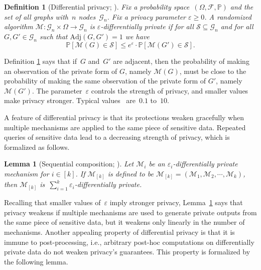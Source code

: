 \documentclass[conference]{ieeeconf}
\newtheorem{definition}{Definition}
\newtheorem{lemma}{Lemma}
\newcommand{\G}{\mathcal{G}}
\newcommand{\M}{\mathcal{M}}
\newcommand{\Adj}{\mathrm{Adj}}
\begin{document}
\begin{definition}[{Differential privacy; \cite{dwork2014algorithmic}}]\label{def:dp}
    Fix a probability space~$(\Omega, \mathcal{F}, \mathbb{P})$ and the set of all graphs with~$n$ nodes~$\G_n$. Fix a privacy parameter $\varepsilon \geq 0$. A randomized algorithm $\M:\G_n\times \Omega\to \G_n$ is $\varepsilon$-differentially private if for all $\mathcal{S} \subseteq \G_n$ and for all $G, G' \in \G_n$ such that $\Adj(G,G')=1$ we have
    \begin{equation}
        \mathbb{P}[\mathcal{M}(G) \in \mathcal{S}] \leq e^{\varepsilon} \cdot \mathbb{P}[\mathcal{M}(G')\in \mathcal{S}].
    \end{equation}
\end{definition}

Definition \ref{def:dp} says that 
if~$G$ and~$G'$ are adjacent, then
the probability of making an observation of the private form of $G$, namely $\M(G)$, must be close to the probability of making the same observation of the private form of $G'$, namely $\M(G')$. The parameter~$\varepsilon$ controls the strength of privacy, and smaller
values make privacy stronger. Typical values~\cite{hsu2014differential} are~$0.1$ to~$10$. 

A feature of differential privacy is that its protections weaken gracefully when multiple mechanisms are applied to the same piece of sensitive data. Repeated queries of sensitive data lead to a decreasing strength of privacy, which is formalized as follows.

\begin{lemma}[{Sequential composition; \cite[Section 3.5]{dwork2014algorithmic}}]\label{lemma:comp}
    Let $\M_i$ be an $\varepsilon_i$-differentially private mechanism for $i\in[k]$. If $\M_{[k]}$ is defined to be $\M_{[k]}=(\M_1, \M_2, \cdots, \M_k)$, then $\M_{[k]}$ is~$\sum_{i=1}^{k} \varepsilon_i$-differentially private.
\end{lemma}

Recalling that smaller values of~$\varepsilon$ imply stronger privacy, Lemma~\ref{lemma:comp} says that privacy weakens if multiple
mechanisms are used to generate private outputs from the same piece of sensitive data, but it weakens only linearly in the number of mechanisms. 
 Another appealing property of differential privacy is that it is immune to post-processing, i.e., arbitrary post-hoc computations on differentially private data do not weaken privacy's guarantees. This property is formalized by the following lemma.
\end{document}
